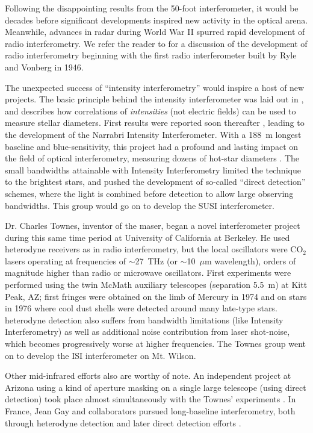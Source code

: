 \documentclass[12pt]{article}
\begin{document}
Following the disappointing results from the 50-foot interferometer,
it would be decades before significant developments inspired new
activity in the optical arena.  Meanwhile, advances in radar during
World War II spurred rapid development of radio interferometry.  We
refer the reader to \citet{tms2001} for a discussion of the
development of radio interferometry beginning with the first radio
interferometer built by Ryle and Vonberg in 1946.

The unexpected success of ``intensity interferometry'' would inspire a host of
new projects.  The basic principle behind the intensity interferometer
was laid out in \citet{hbt1956}, and describes how correlations of
{\em intensities} (not electric fields) can be used to measure stellar
diameters.  First results were reported soon thereafter
\citep{hbt1956b}, leading to the development of the Narrabri Intensity
Interferometer.  With a 188~m longest baseline and
blue-sensitivity, this project had a profound and lasting impact on
the field of optical interferometry, measuring dozens of hot-star
diameters
\citep[e.g.,][]{nii1967a,nii1967b,nii1970a,nii1970b,nii1974}.  The
small bandwidths attainable with Intensity Interferometry limited
the technique to the brightest stars, and pushed the development of
so-called ``direct detection'' schemes, where the light is combined
before detection to allow large observing bandwidths. This group would
go on to develop the SUSI interferometer.

Dr. Charles Townes, inventor of the maser, began a novel
interferometer project during this same time period at University of
California at Berkeley.  He used heterodyne receivers as in radio
interferometry, but the local oscillators were CO$_2$ lasers operating
at frequencies of $\sim$27~THz (or $\sim$10~$\mu$m wavelength), orders
of magnitude higher than radio or microwave oscillators.  First
experiments were performed using the twin McMath auxiliary telescopes
(separation 5.5~m) at Kitt Peak, AZ; first fringes were obtained on
the limb of Mercury in 1974 \citep{jbt1974} and on stars in 1976
\citep{sutton1977,sutton1978,sutton1979,sutton1982} where cool dust
shells were detected around many late-type stars.  heterodyne
detection also suffers from bandwidth limitations (like Intensity
Interferometry) as well as additional noise contribution from laser
shot-noise, which becomes progressively worse at higher frequencies.
The Townes group went on to develop the ISI interferometer on Mt.
Wilson.

Other mid-infrared efforts also are worthy of note.  An independent
project at Arizona using a kind of aperture masking on a single large
telescope (using direct detection) took place almost simultaneously with
the Townes' experiments \citep{mccarthy1975,mccarthy1977,mccarthy1978}.
In France, Jean Gay and collaborators pursued long-baseline
interferometry, both through heterodyne detection
\citep[e.g.,][]{gay1973, assus1979} and later direct detection
efforts \citep[e.g.,][]{rabbia1990}.
\end{document}
